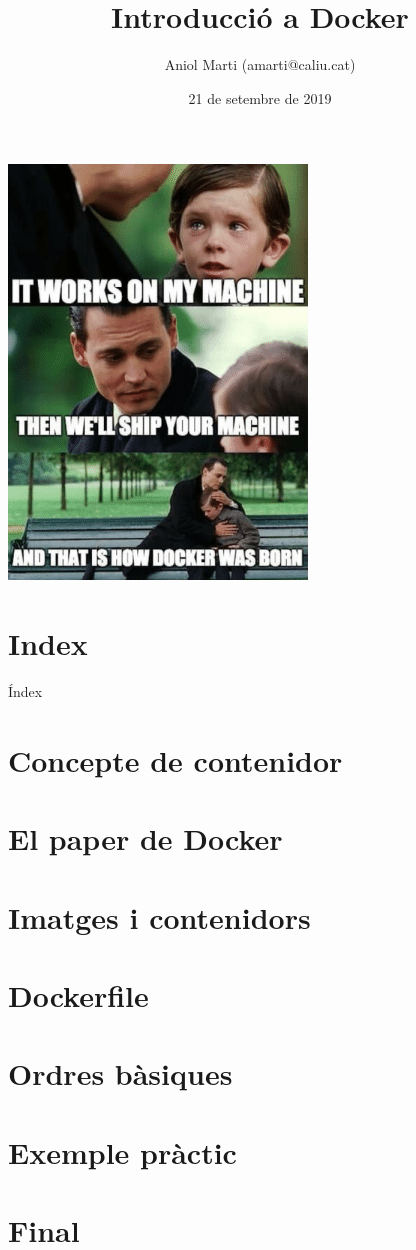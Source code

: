\documentclass[aspectratio=149,dvipsnames,svgnames,unicode]{beamer}
\title{Introducció a Docker}
\author{Aniol Marti (amarti@caliu.cat)}
\institute[Caliu]{Caliu - Catalan Linux Users}
\date{21 de setembre de 2019}
\begin{document}
\begin{frame}[plain]
   \titlepage
\end{frame}

\begin{frame}
\includegraphics[scale=0.6]{Imatges/birth}
\end{frame}

\section*{Index}
\begin{frame}{Índex}
	\tableofcontents
\end{frame}

\section{Concepte de contenidor}

\section{El paper de Docker}

\section{Imatges i contenidors}

\section{Dockerfile}

\section{Ordres bàsiques}

\section{Exemple pràctic}

\section*{Final}

\end{document}
